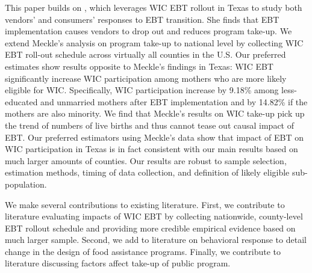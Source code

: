 This paper builds on \cite{meckel2020cure}, which leverages WIC EBT rollout in Texas to study both vendors' and consumers' responses to EBT transition. She finds that EBT implementation causes vendors to drop out and reduces program take-up. We extend Meckle's analysis on program take-up to national level by collecting WIC EBT roll-out schedule across virtually all counties in the U.S. Our preferred estimates show results opposite to Meckle's findings in Texas: WIC EBT significantly increase WIC participation among mothers who are more likely eligible for WIC. Specifically, WIC participation increase by 9.18\% among less-educated and unmarried mothers after EBT implementation and by 14.82\% if the mothers are also minority. We find that Meckle's results on WIC take-up pick up the trend of numbers of live births and thus cannot tease out causal impact of EBT. Our preferred estimators using Meckle's data show that impact of EBT on WIC participation in Texas is in fact consistent with our main results based on much larger amounts of counties. Our results are robust to sample selection, estimation methods, timing of data collection, and definition of likely eligible sub-population.

We make several contributions to existing literature. First, we contribute to literature evaluating impacts of WIC EBT by collecting nationwide, county-level EBT rollout schedule and providing more credible empirical evidence based on much larger sample. Second, we add to literature on behavioral response to detail change in the design of food assistance programs. Finally, we contribute to literature discussing factors affect take-up of public program.